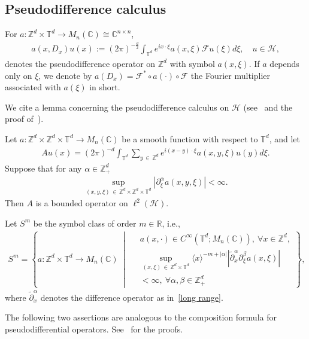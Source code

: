 \documentclass[AHL,Unicode,longabstracts,published]{cedram}
\renewcommand{\a}{\alpha}
\renewcommand{\b}{\beta}
\newcommand{\x}{\xi}
\newcommand{\C}{\mathbb{C}}
\newcommand{\R}{\mathbb{R}}
\newcommand{\Z}{\mathbb{Z}}
\newcommand{\T}{\mathbb{T}}
\newcommand{\HS}{\mathcal{H}}
\newcommand{\FS}{\mathcal{F}}
\newcommand{\jap}[1]{\langle #1 \rangle}
\let\oldforall\forall
\renewcommand*{\forall}{\mathrel{\oldforall}}
\newcommand{\Z}{\mathbb{Z}}
\newcommand{\R}{\mathbb{R}}
\newcommand{\HS}{\mathcal{H}}
\begin{document}
\subsection{Pseudodifference calculus}

For $a:\Z^d \times \T^d \to M_n(\C)\cong \C^{n\times n}$,
\begin{align*}
a(x,D_x)u(x) :=(2\pi)^{-\frac{d}{2}}\int_{\T^d} e^{ix\cdot\x} a(x,\x) \FS u(\x)d\x, \quad u\in \HS,
\end{align*}
denotes the pseudodifference operator on $\Z^d$ with symbol $a(x,\x)$. If $a$ depends only on $\x$, we denote by $a(D_x)=\FS^*\circ a(\cdot) \circ \FS$ the Fourier multiplier associated with $a(\x)$ in short.

We cite a lemma concerning the pseudodifference calculus on $\HS$ (see~\cite[Theorem~4.2.10]{R-T} and the proof of~\cite[Lemma~2.2]{T1}).

\begin{lemm}\label{PDO lemma}
Let $a:\Z^d\times\Z^d\times\T^d \to M_n(\C)$ be a smooth function with respect to $\T^d$, and let
\begin{align*}
Au(x) = (2\pi)^{-d} \int_{\T^d} \sum_{y\,\in\,\Z^d} e^{i(x-y)\cdot\x} a(x,y,\x) u(y)d\x.
\end{align*}
Suppose that for any $\a\in\Z_+^d$
\begin{align}\label{S^0}
\sup_{(x,y,\x)\,\in\,\Z^d\times\Z^d\times\T^d}\left|\partial_{\x}^\a a(x,y,\x)\right| < \infty.
\end{align}
Then $A$ is a bounded operator on $\ell^2(\HS)$.
\end{lemm}

Let $S^m$ be the symbol class of order $m\in\R$, i.e.,
\begin{align*}
S^m=\left\{ a: \Z^d\times\T^d \to M_n(\C) \;\middle|\;
\begin{aligned}
& a(x,\cdot)\in C^\infty\left(\T^d;M_n(\C)\right),\ \forall x\in\Z^d,\\ 
&\sup_{(x,\x)\,\in\,\Z^d\times\T^d} \jap{x}^{-m+|\a|} 
\left|\tilde\partial_{x}^\a\partial_{\x}^\b a(x,\x)\right|\\
&< \infty,\ \forall \a,\b\in\Z_+^d
\end{aligned}
\right\},
\end{align*}
where $\tilde\partial_{x}^\a$ denotes the difference operator as in~\eqref{long range}.

The following two assertions are analogous to the composition formula for pseudodifferential operators. See~\cite[Theorems~4.7.3 and 4.7.10]{R-T} for the proofs.
\end{document}
